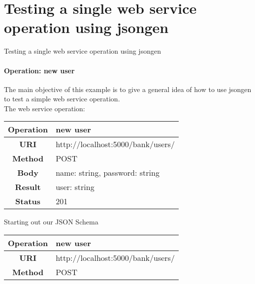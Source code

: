 \section{Testing a single web service operation using jsongen}


\begin{frame}{Testing a single web service operation using jsongen}
  \framesubtitle{Operation: new user}
  The main objective of this example is to give a general idea of how
  to use jsongen to test a simple web service operation.\\

  The web service operation:\\

  \centering
  \begin{tabular}{| c | l |}
    \hline
    \textbf{Operation} & new user \\ \hline
    \textbf{URI}       & http://localhost:5000/bank/users/ \\ \hline
    \textbf{Method}    & POST     \\ \hline
    \textbf{Body}      & name: string, password: string \\ \hline
    \textbf{Result}    & user: string \\ \hline
    \textbf{Status}    & 201 \\ \hline
  \end{tabular}
  \centering
\end{frame}

\begin{frame}{Starting out our JSON Schema}
  \centering
  \begin{tabular}{| c | l |}
    \hline
    \textbf{Operation} & new user \\ \hline
    \textbf{URI}       & http://localhost:5000/bank/users/ \\ \hline
    \textbf{Method}    & POST     \\ \hline
  \end{tabular}

  \centering
  \inputminted{js}{./code/example1_op_description.jsch}
\end{frame}

